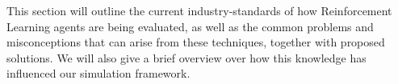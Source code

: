 \begin{jointwork}\label{ch:RelatedWork}
	This section will outline the current industry-standards of how Reinforcement Learning agents are being evaluated, as well as the common problems and misconceptions that can arise from these techniques, together with proposed solutions. We will also give a brief overview over how this knowledge has influenced our simulation framework.
\end{jointwork}